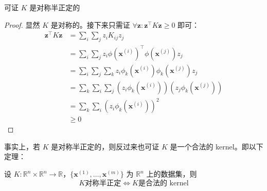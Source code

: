 		可证 $ K $ 是对称半正定的
		\begin{proof}
			显然 $ K $ 是对称的。接下来只需证 $ \forall \bm{z}: \bm{z}^\intercal K \bm{z} \geq 0 $ 即可：
			\begin{align*}
				\bm{z}^\intercal K \bm{z} &= \sum_i \sum_j z_i K_{ij} z_j \\
				&= \sum_i \sum_j z_i \phi(\bm{x}^{(i)})^\intercal \phi(\bm{x}^{(j)}) z_j \\
				&= \sum_i \sum_j \sum_k z_i \phi_k(\bm{x}^{(i)}) \phi_k(\bm{x}^{(j)}) z_j \\
				&= \sum_k \sum_i \sum_j (z_i \phi_k(\bm{x}^{(i)})) (z_j \phi_k(\bm{x}^{(j)})) \\
				&= \sum_k \sum_i ( z_i \phi_k(\bm{x}^{(i)}) )^2 \\
				&\geq 0
			\end{align*}
		\end{proof}
		
		事实上，若 $ K $ 是对称半正定的，则反过来也可证 $ K $ 是一个合法的 kernel。即以下定理：
		\begin{thm}
			设 $ K: \mathbb{R}^n \times \mathbb{R}^n \to \mathbb{R} $，$ \{ \bm{x}^{(1)}, \ldots, \bm{x}^{(m)} \} $ 为 $ \mathbb{R}^n $ 上的数据集，则
			\[ K \text{对称半正定} \iff K \text{是合法的 kernel} \]
		\end{thm}
		
